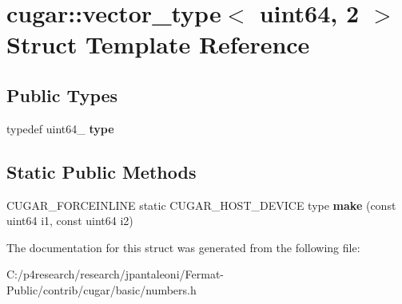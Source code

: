 \hypertarget{structcugar_1_1vector__type_3_01uint64_00_012_01_4}{}\section{cugar\+:\+:vector\+\_\+type$<$ uint64, 2 $>$ Struct Template Reference}
\label{structcugar_1_1vector__type_3_01uint64_00_012_01_4}
\subsection*{Public Types}
\begin{DoxyCompactItemize}
\item 
\mbox{\label{structcugar_1_1vector__type_3_01uint64_00_012_01_4_a7da06c82cc2dbe63c0f5898996157715}} 
typedef uint64\+\_ {\bfseries type}
\end{DoxyCompactItemize}
\subsection*{Static Public Methods}
\begin{DoxyCompactItemize}
\item 
\mbox{\label{structcugar_1_1vector__type_3_01uint64_00_012_01_4_a3d63ac24a5a93cace762ccfa0cd8c407}} 
C\+U\+G\+A\+R\+\_\+\+F\+O\+R\+C\+E\+I\+N\+L\+I\+NE static C\+U\+G\+A\+R\+\_\+\+H\+O\+S\+T\+\_\+\+D\+E\+V\+I\+CE type {\bfseries make} (const uint64 i1, const uint64 i2)
\end{DoxyCompactItemize}


The documentation for this struct was generated from the following file\+:\begin{DoxyCompactItemize}
\item 
C\+:/p4research/research/jpantaleoni/\+Fermat-\/\+Public/contrib/cugar/basic/numbers.\+h\end{DoxyCompactItemize}

